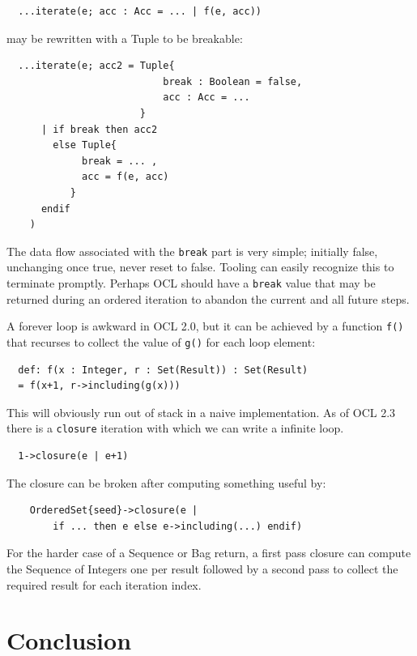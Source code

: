 \documentclass[sigconf]{acmart}
\begin{document}
\begin{verbatim}
  ...iterate(e; acc : Acc = ... | f(e, acc)) 
\end{verbatim} 

may be rewritten with a Tuple to be breakable:

\begin{verbatim}
  ...iterate(e; acc2 = Tuple{
                           break : Boolean = false,
                           acc : Acc = ...
                       }
      | if break then acc2
        else Tuple{
             break = ... ,
             acc = f(e, acc)
           }
      endif
    ) 
\end{verbatim} 

The data flow associated with the \verb|break| part is very simple; initially false, unchanging once true, never reset to false. Tooling can easily recognize this to terminate promptly. Perhaps OCL should have a \verb|break| value that may be returned during an ordered iteration to abandon the current and all future steps.

A forever loop is awkward in OCL 2.0, but it can be achieved by a function \verb|f()| that recurses to collect the value of \verb|g()| for each loop element: 

\begin{verbatim}
  def: f(x : Integer, r : Set(Result)) : Set(Result)
  = f(x+1, r->including(g(x)))
\end{verbatim} 

This will obviously run out of stack in a naive implementation. As of OCL 2.3~\cite{OCL-2.3} there is a \verb|closure| iteration with which we can write a infinite loop.  

\begin{verbatim}
  1->closure(e | e+1)
\end{verbatim} 

The closure can be broken after computing something useful by:

\begin{verbatim}
	OrderedSet{seed}->closure(e |
	    if ... then e else e->including(...) endif)
\end{verbatim} 

For the harder case of a Sequence or Bag return, a first pass closure can compute the Sequence of Integers one per result followed by a second pass to collect the required result for each iteration index.

\section{Conclusion}\label{Conclusion}
\end{document}
